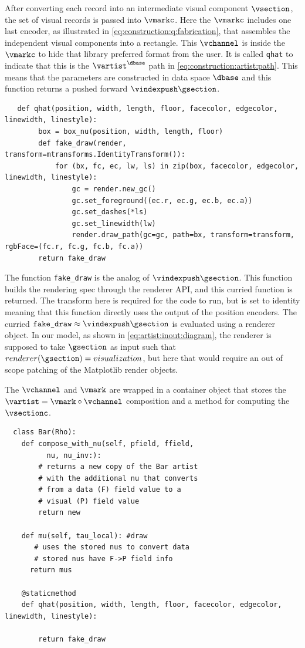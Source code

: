 \documentclass[10pt,journal,compsoc]{IEEEtran}
\theoremstyle{definition}
\theoremstyle{remark}
\begin{document}
After converting each record into an intermediate visual component $\vsection$, the set of visual records is passed into $\vmarkc$. Here the $\vmarkc$ includes one last encoder, as illustrated in \autoref{eq:construction:q:fabrication}, that assembles the independent visual components into a rectangle. This $\vchannel$ is inside the $\vmarkc$ to hide that library preferred format from the user. It is called \texttt{qhat} to indicate that this is the $\vartist^{\dbase}$ path in \autoref{eq:construction:artist:path}.  This means that the parameters are constructed in data space $\dbase$ and this function returns a pushed forward $\vindexpush\gsection$. 

\begin{verbatim}
   def qhat(position, width, length, floor, facecolor, edgecolor, linewidth, linestyle): 
        box = box_nu(position, width, length, floor)
        def fake_draw(render, transform=mtransforms.IdentityTransform()):
            for (bx, fc, ec, lw, ls) in zip(box, facecolor, edgecolor, linewidth, linestyle):
                gc = render.new_gc()
                gc.set_foreground((ec.r, ec.g, ec.b, ec.a))
                gc.set_dashes(*ls)
                gc.set_linewidth(lw)
                render.draw_path(gc=gc, path=bx, transform=transform, rgbFace=(fc.r, fc.g, fc.b, fc.a))
        return fake_draw
\end{verbatim}
The function \texttt{fake\_draw} is the analog of $\vindexpush\gsection$. This function builds the rendering spec through the renderer API, and this curried function is returned. The transform here is required for the code to run, but is set to identity meaning that this function directly uses the output of the position encoders. The curried $\texttt{fake\_draw} \approx \vindexpush \gsection$ is evaluated using a renderer object. In our model, as shown in \autoref{eq:artist:inout:diagram}, the renderer is supposed to take $\gsection$ as input such that $renderer(\gsection) = visualization$, but here that would require an out of scope patching of the Matplotlib render objects. 

The $\vchannel$ and $\vmark$ are wrapped in a container object that stores the $\vartist = \vmark \circ \vchannel$ composition and a method for computing the $\vsectionc$.
\begin{verbatim}
  class Bar(Rho): 
    def compose_with_nu(self, pfield, ffield, 
          nu, nu_inv:):
        # returns a new copy of the Bar artist 
        # with the additional nu that converts 
        # from a data (F) field value to a 
        # visual (P) field value
        return new

    def mu(self, tau_local): #draw
       # uses the stored nus to convert data
       # stored nus have F->P field info
      return mus
    
    @staticmethod
    def qhat(position, width, length, floor, facecolor, edgecolor, linewidth, linestyle):
       
        return fake_draw
\end{verbatim}
\end{document}
